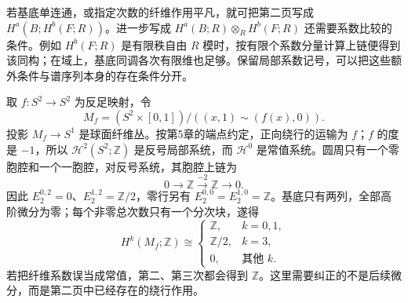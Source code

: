 若基底单连通，或指定次数的纤维作用平凡，就可把第二页写成 \(H^a(B;H^b(F;R))\)。进一步写成 \(H^a(B;R)\otimes_RH^b(F;R)\) 还需要系数比较的条件。例如 \(H^b(F;R)\) 是有限秩自由 \(R\) 模时，按有限个系数分量计算上链便得到该同构；在域上，基底同调各次有限维也足够。保留局部系数记号，可以把这些额外条件与谱序列本身的存在条件分开。

\begin{example}\label{g2:exm:serre-twisted-sphere-mapping-torus}
	取 \(f:S^2\to S^2\) 为反足映射，令
	\[
		M_f=(S^2\times[0,1])/((x,1)\sim(f(x),0)).
	\]
	投影 \(M_f\to S^1\) 是球面纤维丛。按第5章的端点约定，正向绕行的运输为 \(f\)；\(f\) 的度是 \(-1\)，所以 \(\mathcal H^2(S^2;\mathbb Z)\) 是反号局部系统，而 \(\mathcal H^0\) 是常值系统。圆周只有一个零胞腔和一个一胞腔，对反号系统，其胞腔上链为
	\[
		0\longrightarrow\mathbb Z\xrightarrow{-2}\mathbb Z\longrightarrow0.
	\]
	因此 \(E_2^{0,2}=0\)、\(E_2^{1,2}=\mathbb Z/2\)，零行另有 \(E_2^{0,0}=E_2^{1,0}=\mathbb Z\)。基底只有两列，全部高阶微分为零；每个非零总次数只有一个分次块，遂得
	\[
		H^k(M_f;\mathbb Z)\cong
		\begin{cases}
			\mathbb Z,&k=0,1,\\
			\mathbb Z/2,&k=3,\\
			0,&\text{其他 }k.
		\end{cases}
	\]
	若把纤维系数误当成常值，第二、第三次都会得到 \(\mathbb Z\)。这里需要纠正的不是后续微分，而是第二页中已经存在的绕行作用。
\end{example}

